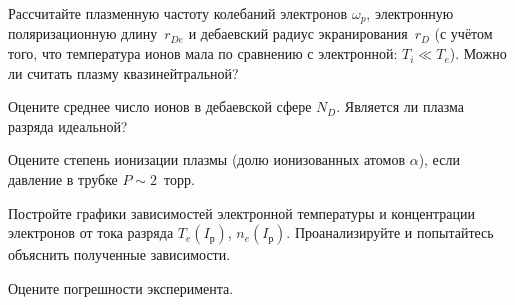 \begin{lab:task}
\item Рассчитайте плазменную частоту колебаний электронов $\omega_p$,
электронную поляризационную длину~$r_{De}$ и дебаевский радиус экранирования~$r_D$
(с учётом того, что температура ионов мала по сравнению с электронной: $T_i\ll T_e$). 
Можно ли считать плазму квазинейтральной?

\item Оцените среднее число ионов в дебаевской сфере $N_D$. 
Является ли плазма разряда идеальной?

\item Оцените степень ионизации плазмы (долю ионизованных атомов $\alpha$),
если давление в трубке $P\sim 2$~торр.

\item Постройте графики зависимостей электронной температуры и
концентрации электронов от тока разряда $T_e(I_р)$, $n_e(I_р)$.
Проанализируйте и попытайтесь объяснить полученные зависимости.






\item Оцените погрешности эксперимента.

\end{lab:task}


